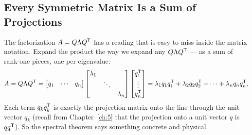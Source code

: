 
\subsection{Every Symmetric Matrix Is a Sum of Projections}

The factorization $A=Q\Lambda Q^{\mathsf T}$ has a reading that is easy to miss inside the matrix notation. Expand the product the way we expand any $Q\Lambda Q^{\mathsf T}$ --- as a sum of rank-one pieces, one per eigenvalue:
\[
   A=Q\Lambda Q^{\mathsf T}
   =\begin{bmatrix} q_1 & \cdots & q_n\end{bmatrix}
   \begin{bmatrix} \lambda_1 & & \\ & \ddots & \\ & & \lambda_n\end{bmatrix}
   \begin{bmatrix} q_1^{\mathsf T} \\ \vdots \\ q_n^{\mathsf T}\end{bmatrix}
   =\lambda_1 q_1 q_1^{\mathsf T}+\lambda_2 q_2 q_2^{\mathsf T}+\cdots+\lambda_n q_n q_n^{\mathsf T} .
\]
Each term $q_k q_k^{\mathsf T}$ is exactly the projection matrix onto the line through the unit vector $q_k$ (recall from Chapter~\ref{ch:5} that the projection onto a unit vector $q$ is $qq^{\mathsf T}$). So the spectral theorem says something concrete and physical.


